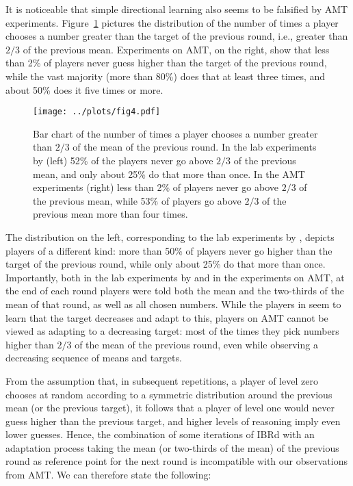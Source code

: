 \documentclass[12pt,review]{elsarticle}
\begin{document}
It is noticeable that simple directional learning also seems to be
falsified by AMT experiments. Figure~\ref{fig:above-2/3} pictures
the distribution of the number of times a player chooses a number
greater than the target of the previous round, i.e., greater than
$2/3$ of the previous mean. Experiments on AMT, on the right, show
that less than 2\% of players never guess higher than the target of
the previous round, while the vast majority (more than 80\%) does
that at least three times, and about 50\% does it five times or more.

\begin{figure}
\texttt{[image: ../plots/fig4.pdf]}
\caption{Bar chart of the number of times a player chooses a number greater
than $2/3$ of the mean of the previous round. In the lab experiments
by \citet{Nagel95} (left) 52\% of the players never go above $2/3$
of the previous mean, and only about 25\% do that more than once.
In the AMT experiments (right) less than 2\% of players never go above
$2/3$ of the previous mean, while 53\% of players go above $2/3$
of the previous mean more than four times.}
\label{fig:above-2/3}
\end{figure}

The distribution on the left, corresponding to the lab experiments
by \citet{Nagel95}, depicts players of a different kind: more than
50\% of players never go higher than the target of the previous round,
while only about 25\% do that more than once. Importantly, both in
the lab experiments by \citet{Nagel95} and in the experiments on AMT,
at the end of each round players were told both the mean and the two-thirds
of the mean of that round, as well as all chosen numbers.%
{} While the players in \citet{Nagel95} seem to learn that the target
decreases and adapt to this, players on AMT cannot be viewed as adapting
to a decreasing target: most of the times they pick numbers higher
than $2/3$ of the mean of the previous round, even while observing
a decreasing sequence of means and targets.

From the assumption that, in subsequent repetitions, a player of level
zero chooses at random according to a symmetric distribution around
the previous mean (or the previous target), it follows that a player
of level one would never guess higher than the previous target, and
higher levels of reasoning imply even lower guesses. Hence, the combination
of some iterations of IBRd with an adaptation process taking the mean
(or two-thirds of the mean) of the previous round as reference point
for the next round is incompatible with our observations from AMT.
We can therefore state the following:
\end{document}
